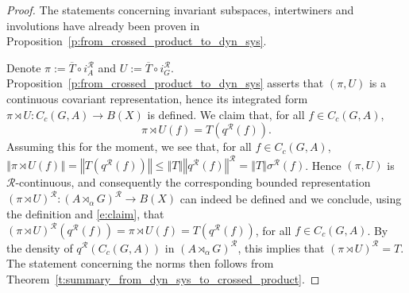 \documentclass{amsart}
\theoremstyle{plain}
\theoremstyle{definition}
\numberwithin{equation}{section}
\begin{document}
\begin{proof}
The statements concerning invariant subspaces, intertwiners and involutions have already been proven in Proposition~\ref{p:from_crossed_product_to_dyn_sys}.

Denote $\pi := \overline{T} \circ i_A^{\mathcal R}$ and $U := \overline{T} \circ i_G^{\mathcal R}$. Proposition~\ref{p:from_crossed_product_to_dyn_sys} asserts that $(\pi,U)$ is a continuous covariant representation, hence its integrated form ${\pi \rtimes U}:C_c(G,A)\to B(X)$ is defined.
We claim that, for all $f\in C_c(G,A)$,
\begin{equation}\label{e:claim}
{\pi \rtimes U}(f)=T({q^{\mathcal R}}(f)).
\end{equation}
Assuming this for the moment, we see that, for all $f\in C_c(G,A)$, ${\left\Vert {{\pi \rtimes U}(f)} \right\Vert}={\left\Vert {T({q^{\mathcal R}}(f))} \right\Vert}\leq{\left\Vert {T} \right\Vert}{\left\Vert {{q^{\mathcal R}}(f)} \right\Vert^{\mathcal R}}={\left\Vert {T} \right\Vert}{\sigma^{\mathcal R}}(f)$. Hence $(\pi,U)$ is ${\mathcal R}$-continuous, and consequently the corresponding bounded representation $({\pi \rtimes U})^{\mathcal R}:{(A {\rtimes}_\alpha G)^\mathcal{R}}\to B(X)$ can indeed be defined and we conclude, using the definition and \eqref{e:claim}, that $({\pi \rtimes U})^{\mathcal R}({q^{\mathcal R}}(f))={\pi \rtimes U}(f)=T({q^{\mathcal R}}(f))$, for all $f\in C_c(G,A)$. By the density of ${q^{\mathcal R}}(C_c(G,A))$ in ${(A {\rtimes}_\alpha G)^\mathcal{R}}$, this implies that $({\pi \rtimes U})^{\mathcal R}=T$. The statement concerning the norms then follows from Theorem~\ref{t:summary_from_dyn_sys_to_crossed_product}.


\end{proof}
\end{document}
